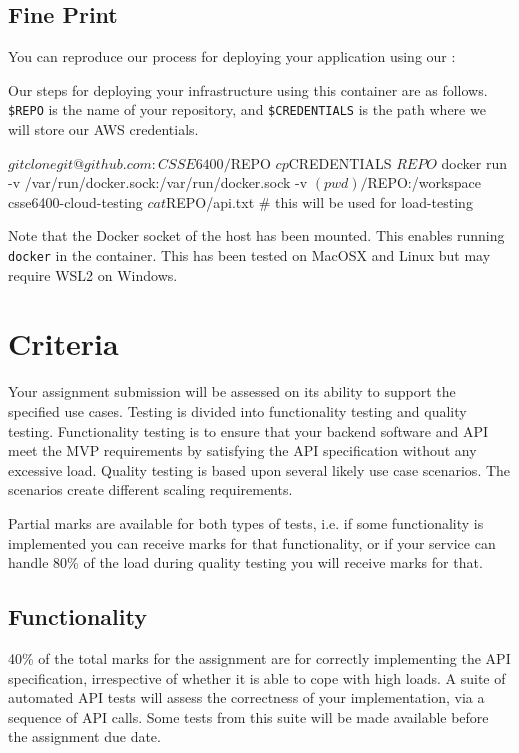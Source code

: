 \documentclass{csse4400}
\begin{document}
\subsection{Fine Print}
You can reproduce our process for deploying your application using our :

Our steps for deploying your infrastructure using this container are as follows.
\texttt{\$REPO} is the name of your repository, and
\texttt{\$CREDENTIALS} is the path where we will store our AWS credentials.
\begin{code}[language=shell]{}
$ git clone git@github.com:CSSE6400/$REPO
$ cp $CREDENTIALS $REPO
$ docker run -v /var/run/docker.sock:/var/run/docker.sock -v $(pwd)/$REPO:/workspace csse6400-cloud-testing
$ cat $REPO/api.txt # this will be used for load-testing
\end{code}

\noindent
Note that the Docker socket of the host has been mounted.
This enables running \texttt{docker} in the container.
This has been tested on MacOSX and Linux but may require WSL2 on Windows.


\section{Criteria}
Your assignment submission will be assessed on its ability to support the specified use cases.
Testing is divided into functionality testing and quality testing.
Functionality testing is to ensure that your backend software and API meet the MVP requirements by satisfying the API specification without any excessive load.
Quality testing is based upon several likely use case scenarios.
The scenarios create different scaling requirements.

Partial marks are available for both types of tests,
i.e. if some functionality is implemented you can receive marks for that functionality,
or if your service can handle 80\% of the load during quality testing you will receive marks for that.

\subsection{Functionality}
40\% of the total marks for the assignment are for correctly implementing the API specification,
irrespective of whether it is able to cope with high loads.
A suite of automated API tests will assess the correctness of your implementation, via a sequence of API calls.
Some tests from this suite will be made available before the assignment due date.
\end{document}
